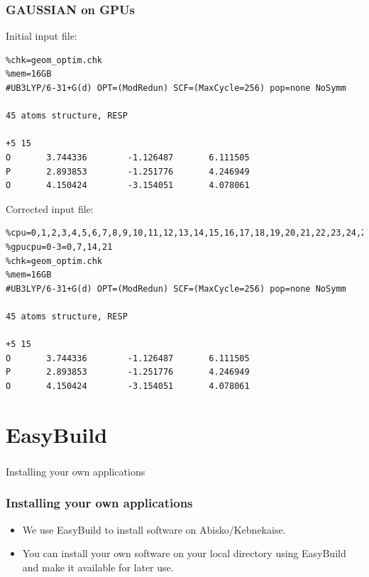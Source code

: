 \begin{frame}[fragile]
	\frametitle{GAUSSIAN on GPUs}
  
Initial input file:
{\tiny
        \begin{verbatim}             
%chk=geom_optim.chk
%mem=16GB
#UB3LYP/6-31+G(d) OPT=(ModRedun) SCF=(MaxCycle=256) pop=none NoSymm

45 atoms structure, RESP

+5 15
O       3.744336        -1.126487       6.111505
P       2.893853        -1.251776       4.246949
O       4.150424        -3.154051       4.078061
        \end{verbatim}
}

Corrected input file:

{\tiny
        \begin{verbatim}             
%cpu=0,1,2,3,4,5,6,7,8,9,10,11,12,13,14,15,16,17,18,19,20,21,22,23,24,25,26,27
%gpucpu=0-3=0,7,14,21
%chk=geom_optim.chk
%mem=16GB
#UB3LYP/6-31+G(d) OPT=(ModRedun) SCF=(MaxCycle=256) pop=none NoSymm

45 atoms structure, RESP

+5 15
O       3.744336        -1.126487       6.111505
P       2.893853        -1.251776       4.246949
O       4.150424        -3.154051       4.078061
        \end{verbatim}
}


\end{frame}

\section{EasyBuild}
\begin{frame}
	\frametitle{}
\begin{center}
{\Huge Installing your own applications}
\end{center}
\end{frame}
\begin{frame}[fragile]
	\frametitle{Installing your own applications}
  
\begin{itemize}

\item We use EasyBuild to install software on Abisko/Kebnekaise.

\item You can install your own software on your local directory using EasyBuild
and make it available for later use.





\end{itemize}

\end{frame}

